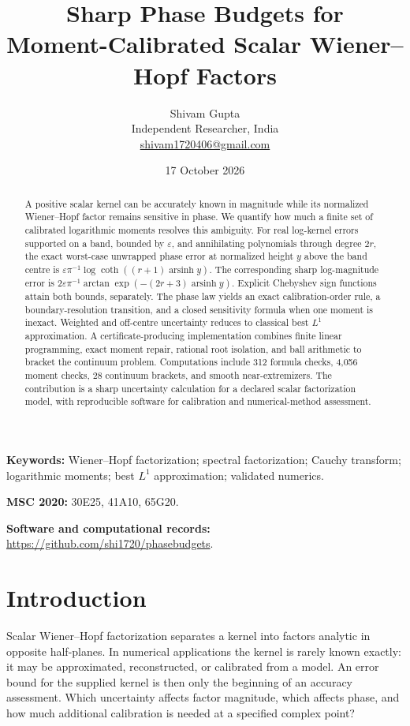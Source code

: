 \documentclass[11pt]{article}
\title{\bfseries Sharp Phase Budgets for\\Moment-Calibrated Scalar Wiener--Hopf Factors}
\author{Shivam Gupta\\
\small Independent Researcher, India\\
\small\href{mailto:shivam1720406@gmail.com}{shivam1720406@gmail.com}}
\date{17 October 2026}
\theoremstyle{remark}\newtheorem{remark}[theorem]{Remark}
\newcommand{\eps}{\varepsilon}
\newcommand{\asinh}{\operatorname{arsinh}}
\begin{document}
\maketitle
\begin{abstract}
A positive scalar kernel can be accurately known in magnitude while its normalized
Wiener--Hopf factor remains sensitive in phase. We quantify how much a finite set
of calibrated logarithmic moments resolves this ambiguity. For real log-kernel
errors supported on a band, bounded by $\eps$, and annihilating polynomials through
degree $2r$, the exact worst-case unwrapped phase error at normalized height $y$
above the band centre is
$\eps\pi^{-1}\log\coth((r+1)\asinh y)$.
The corresponding sharp log-magnitude error is
$2\eps\pi^{-1}\arctan\exp(-(2r+3)\asinh y)$.
Explicit Chebyshev sign functions attain both bounds, separately.
The phase law yields an exact calibration-order rule, a boundary-resolution
transition, and a closed sensitivity formula when one moment is inexact.
Weighted and off-centre uncertainty reduces to classical best $L^1$ approximation.
A certificate-producing implementation combines finite linear programming,
exact moment repair, rational root isolation, and ball arithmetic to bracket the
continuum problem. Computations include 312 formula checks, 4,056 moment checks,
28 continuum brackets, and smooth near-extremizers. The contribution is a sharp
uncertainty calculation for a declared scalar factorization model, with
reproducible software for calibration and numerical-method assessment.
\end{abstract}

\noindent\textbf{Keywords:} Wiener--Hopf factorization; spectral factorization;
Cauchy transform; logarithmic moments; best $L^1$ approximation; validated numerics.

\smallskip
\noindent\textbf{MSC 2020:} 30E25, 41A10, 65G20.

\smallskip
\noindent\textbf{Software and computational records:}
\url{https://github.com/shi1720/phasebudgets}.

\section{Introduction}
Scalar Wiener--Hopf factorization separates a kernel into factors analytic in
opposite half-planes. In numerical applications the kernel is rarely known
exactly: it may be approximated, reconstructed, or calibrated from a model.
An error bound for the supplied kernel is then only the beginning of an accuracy
assessment. Which uncertainty affects factor magnitude, which affects phase,
and how much additional calibration is needed at a specified complex point?
\end{document}
